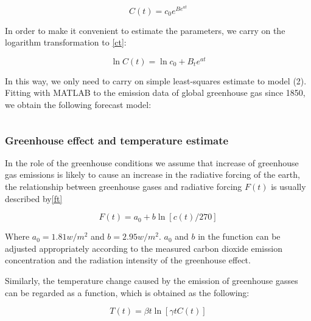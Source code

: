 \documentclass[12pt]{article}  %
\begin{document}
\begin{equation}\label{ct}
    C\left( t \right) =c_0e^{Be^{at}}
\end{equation}







In order to make it convenient to estimate the parameters, we carry on the logarithm transformation to \eqref{ct}:



\begin{equation}
    \ln C\left( t \right) =\ln c_0+B_te^{at}
\end{equation}


In this way, we only need to carry on simple least-squares estimate to model (2). Fitting with MATLAB to the emission data of global greenhouse gas since 1850, we obtain the following forecast model:

\begin{equation}
    \label{lnct}
\end{equation}



\subsubsection{Greenhouse effect and temperature estimate}
In the role of the greenhouse conditions we assume that increase of greenhouse gas emissions is likely to cause an increase in the radiative forcing of the earth, the relationship between greenhouse gases and radiative forcing $F(t)$ is usually described by\eqref{ft}


\begin{equation}\label{ft}
    F\left( t \right) =a_0+b\ln \left[ c\left( t \right) /270 \right] 
\end{equation}


Where $a_0=1.81w/m^2$ and $b=2.95w/m^2$. $a_0$ and $b$ in the function can be adjusted appropriately according to the measured carbon dioxide emission concentration and the radiation intensity of the greenhouse effect.


Similarly, the temperature change caused by the emission of greenhouse gasses can be regarded as a function, which is obtained as the following:



\begin{equation}
    T\left( t \right) =\beta t\ln \left[ \gamma tC\left( t \right)\right]
\end{equation}
\end{document}
